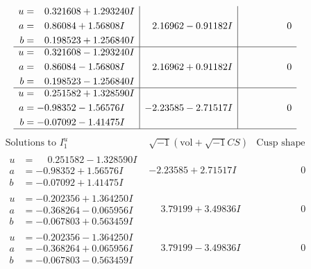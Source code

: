\documentclass[1p]{elsarticle_modified}
\theoremstyle{definition}
\newcommand{\I}{\sqrt{-1}}
\begin{document}
$$\begin{array}{c|c|c}
\begin{aligned}
u &= \phantom{-}0.321608 + 1.293240 I \\
a &= \phantom{-}0.86084 + 1.56808 I \\
b &= \phantom{-}0.198523 + 1.256840 I\end{aligned}
 & \phantom{-}2.16962 - 0.91182 I & \phantom{-0.000000 } 0 \\ \hline\begin{aligned}
u &= \phantom{-}0.321608 - 1.293240 I \\
a &= \phantom{-}0.86084 - 1.56808 I \\
b &= \phantom{-}0.198523 - 1.256840 I\end{aligned}
 & \phantom{-}2.16962 + 0.91182 I & \phantom{-0.000000 } 0 \\ \hline\begin{aligned}
u &= \phantom{-}0.251582 + 1.328590 I \\
a &= -0.98352 - 1.56576 I \\
b &= -0.07092 - 1.41475 I\end{aligned}
 & -2.23585 - 2.71517 I & \phantom{-0.000000 } 0\\
 \hline 
 \end{array}$$\newpage$$\begin{array}{c|c|c}  
\text{Solutions to }I^u_{1}& \I (\text{vol} + \sqrt{-1}CS) & \text{Cusp shape}\\
 \hline 
\begin{aligned}
u &= \phantom{-}0.251582 - 1.328590 I \\
a &= -0.98352 + 1.56576 I \\
b &= -0.07092 + 1.41475 I\end{aligned}
 & -2.23585 + 2.71517 I & \phantom{-0.000000 } 0 \\ \hline\begin{aligned}
u &= -0.202356 + 1.364250 I \\
a &= -0.368264 - 0.065956 I \\
b &= -0.067803 + 0.563459 I\end{aligned}
 & \phantom{-}3.79199 + 3.49836 I & \phantom{-0.000000 } 0 \\ \hline\begin{aligned}
u &= -0.202356 - 1.364250 I \\
a &= -0.368264 + 0.065956 I \\
b &= -0.067803 - 0.563459 I\end{aligned}
 & \phantom{-}3.79199 - 3.49836 I & \phantom{-0.000000 } 0 \\ \hline\begin{aligned}

\end{aligned}
\end{array}$$
\end{document}
